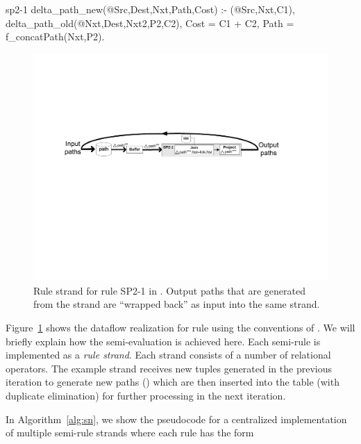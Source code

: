 \begin{NDlog}
sp2-1 delta_path_new(@Src,Dest,Nxt,Path,Cost) :- \link(@Src,Nxt,C1),
          delta_path_old(@Nxt,Dest,Nxt2,P2,C2), 
          Cost = C1 + C2, 
          Path = f\_concatPath(Nxt,P2).
\end{NDlog}

\begin{figure}[ht]
\centering
  \includegraphics[width=5in]{graphs/dataflow}
\caption{\label{Dataflow}{\small Rule strand for rule SP2-1 in
    \Sys. Output paths that are generated from the strand are ``wrapped
    back'' as input into the same strand. }}
\end{figure}                                        


Figure~\ref{Dataflow} shows the dataflow realization for rule 
using the conventions of \Sys. We will briefly explain how the
semi-\naive evaluation is achieved here. Each semi-\naive rule is
implemented as a {\em rule strand}. Each strand consists of a number
of relational operators. The example strand receives new
 tuples generated in the previous iteration to
generate new paths () which are then inserted
into the  table (with duplicate elimination) for further
processing in the next iteration.


In Algorithm~\ref{alg:sn}, we show the pseudocode for a centralized
\Sys implementation of multiple semi-\naive rule strands where each
rule has the form 

